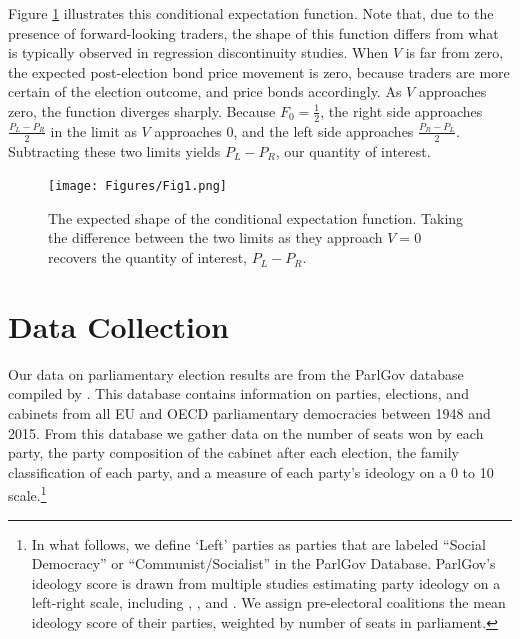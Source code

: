 \documentclass[12pt]{article}
\begin{document}
Figure \ref{fig:CEF} illustrates this conditional expectation function. Note that, due to the presence of forward-looking traders, the shape of this function differs from what is typically observed in regression discontinuity studies. When $V$ is far from zero, the expected post-election bond price movement is zero, because traders are more certain of the election outcome, and price bonds accordingly. As $V$ approaches zero, the function diverges sharply. Because $F_0 =\frac{1}{2}$, the right side approaches $\frac{P_L - P_R}{2}$ in the limit as $V$ approaches $0$, and the left side approaches $\frac{P_R - P_L}{2}$. Subtracting these two limits yields $P_L - P_R$, our quantity of interest. 

\begin{figure}[h]
    \centering
    \texttt{[image: Figures/Fig1.png]}
    \caption{The expected shape of the conditional expectation function. Taking the difference between the two limits as they approach $V=0$ recovers the quantity of interest, $P_L - P_R$.}
    \label{fig:CEF}
\end{figure}



\section{Data Collection} \label{section:data}

Our data on parliamentary election results are from the ParlGov database compiled by \citet{Doring2018}. This database contains information on parties, elections, and cabinets from all EU and OECD parliamentary democracies between 1948 and 2015. From this database we gather data on the number of seats won by each party, the party composition of the cabinet after each election, the family classification of each party, and a measure of each party's ideology on a 0 to 10 scale.\footnote{In what follows, we define `Left' parties as parties that are labeled ``Social Democracy'' or ``Communist/Socialist'' in the ParlGov Database. ParlGov's ideology score is drawn from multiple studies estimating party ideology on a left-right scale, including \citet{Castles1984}, \citet{Huber1995}, and \citet{Benoit2006}. We assign pre-electoral coalitions the mean ideology score of their parties, weighted by number of seats in parliament.}
\end{document}
